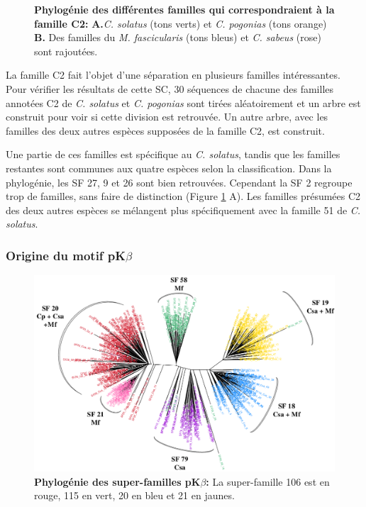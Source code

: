 \documentclass[12pt,a4paper]{article}
\begin{document}
\begin{figure}
\begin{tabular}{cccc}
	\end{tabular}
	\caption{\textbf{Phylogénie des différentes familles qui correspondraient à la famille C2:}
	\textbf{A.}\textit{C. solatus} (tons verts) et \textit{C. pogonias} (tons orange) \textbf{B.} Des familles du \textit{M. fascicularis} (tons bleus) et \textit{C. sabeus} (rose) sont rajoutées.	 
	\label{tree_C2}} 
\end{figure}

		La famille C2 fait l'objet d'une séparation en plusieurs familles intéressantes. Pour vérifier les résultats de cette SC, 30 séquences de chacune des familles annotées C2 de \textit{C. solatus} et \textit{C. pogonias} sont tirées aléatoirement et un arbre est construit pour voir si cette division est retrouvée. Un autre arbre,  avec les familles des deux autres espèces supposées de la famille C2,  est construit.
		
		Une partie de ces familles est spécifique au \textit{C. solatus}, tandis que les familles restantes sont communes aux quatre espèces selon la classification. Dans la phylogénie, les SF 27, 9 et 26 sont bien retrouvées. Cependant la SF 2 regroupe trop de familles, sans faire de distinction (Figure \ref{tree_C2} A). Les familles présumées C2 des deux autres espèces se mélangent plus spécifiquement avec la famille 51 de \textit{C. solatus}.
						
	\subsubsection{Origine du motif pK$\beta$}
	
	\begin{figure}	
			\centering
				\includegraphics[scale=0.3]{img/pkb_tree.png}				
				\caption{\textbf{Phylogénie des super-familles pK$\beta$:} La super-famille 106 est en rouge, 115 en vert, 20 en bleu et 21 en jaunes.
	\label{fig:pkb_tree}} 
	\end{figure}
\end{document}
